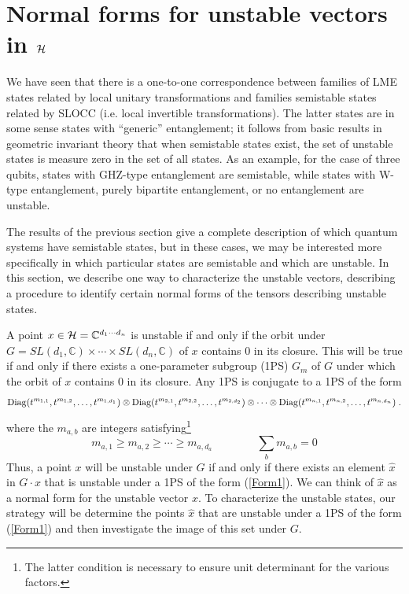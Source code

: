 \documentclass[12pt]{article}
\theoremstyle{definition}
\newcommand{\be}{\begin{equation}}
\newcommand{\ee}{\end{equation}}
\begin{document}
\section{Normal forms for unstable vectors in ${\cal H}$}

We have seen that there is a one-to-one correspondence between families of LME states related by local unitary transformations and families semistable states related by SLOCC (i.e. local invertible transformations). The latter states are in some sense states with ``generic'' entanglement; it follows from basic results in geometric invariant theory that when semistable states exist, the set of unstable states is measure zero in the set of all states. As an example, for the case of three qubits, states with GHZ-type entanglement are semistable, while states with W-type entanglement, purely bipartite entanglement, or no entanglement are unstable.

The results of the previous section give a complete description of which quantum systems have semistable states, but in these cases, we may be interested more specifically in which particular states are semistable and which are unstable. In this section, we describe one way to characterize the unstable vectors, describing a procedure to identify certain normal forms of the tensors describing unstable states.

A point $x \in {\cal H} = \mathbb{C}^{d_1 \cdots d_n}$ is unstable if and only if the orbit under $G = SL(d_1, \mathbb{C}) \times \cdots \times SL(d_n, \mathbb{C})$ of $x$ contains 0 in its closure. This will be true if and only if there exists a one-parameter subgroup (1PS) $G_m$ of $G$ under which the orbit of $x$ contains 0 in its closure. Any 1PS is conjugate to a 1PS of the form
\be
\label{Form1}
{\rm Diag} (t^{m_{1,1}}, t^{m_{1,2}}, \dots, t^{m_{1,d_1}}) \otimes {\rm Diag} (t^{m_{2,1}}, t^{m_{2,2}}, \dots, t^{m_{2,d_2}}) \otimes \cdots \otimes {\rm Diag} (t^{m_{n,1}}, t^{m_{n,2}}, \dots, t^{m_{n,d_n}})\; .
\ee
where the $m_{a,b}$ are integers satisfying\footnote{The latter condition is necessary to ensure unit determinant for the various factors.}
\be
\label{mconds}
m_{a,1} \ge m_{a,2} \ge \cdots \ge m_{a,d_a} \qquad \qquad \sum_b m_{a,b} =0
\ee
Thus, a point $x$ will be unstable under $G$ if and only if there exists an element $\hat{x}$ in $G \cdot x$ that is unstable under a 1PS of the form (\ref{Form1}). We can think of $\hat{x}$ as a normal form for the unstable vector $x$.
To characterize the unstable states, our strategy will be determine the points $\hat{x}$ that are unstable under a 1PS of the form (\ref{Form1}) and then investigate the image of this set under $G$.
\end{document}
